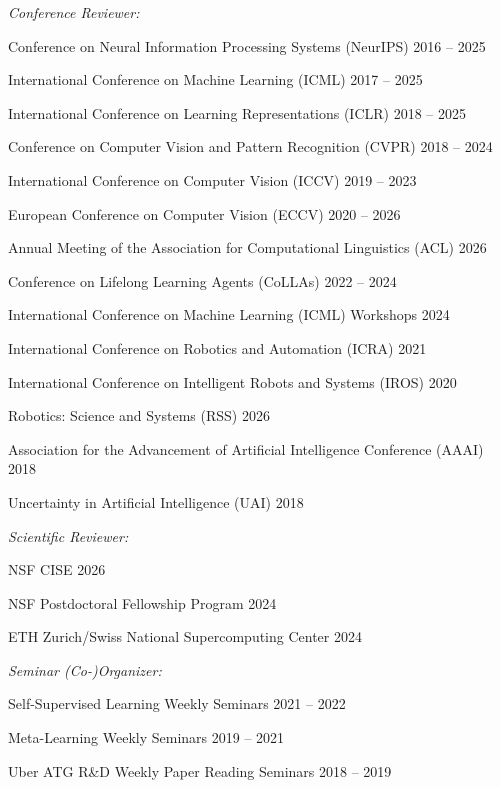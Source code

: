 {\it Conference Reviewer:}
\begin{list2}
\item Conference on Neural Information Processing Systems (NeurIPS)
 \hfill 2016 -- 2025
\item International Conference on Machine Learning (ICML)
 \hfill 2017 -- 2025
\item International Conference on Learning Representations (ICLR)
 \hfill 2018 -- 2025
\item Conference on Computer Vision and Pattern Recognition (CVPR)
 \hfill 2018 -- 2024
\item International Conference on Computer Vision (ICCV)
 \hfill 2019 -- 2023
\item European Conference on Computer Vision (ECCV)
 \hfill 2020 -- 2026
\item Annual Meeting of the Association for Computational Linguistics (ACL)
 \hfill 2026
\item Conference on Lifelong Learning Agents (CoLLAs)
 \hfill 2022 -- 2024
\item International Conference on Machine Learning (ICML) Workshops
 \hfill 2024
\item International Conference on Robotics and Automation (ICRA)
 \hfill 2021
\item International Conference on Intelligent Robots and Systems (IROS)
 \hfill 2020
\item Robotics: Science and Systems (RSS)
 \hfill 2026
\item Association for the Advancement of Artificial Intelligence Conference (AAAI)
 \hfill 2018
\item Uncertainty in Artificial Intelligence (UAI)
 \hfill 2018
\end{list2}

{\it Scientific Reviewer:}
\begin{list2}
\item NSF CISE \hfill 2026
\item NSF Postdoctoral Fellowship Program \hfill 2024
\item ETH Zurich/Swiss National Supercomputing Center \hfill 2024
\end{list2}

{\it Seminar (Co-)Organizer:}
\begin{list2}
\item Self-Supervised Learning Weekly Seminars \hfill 2021 -- 2022
\item Meta-Learning Weekly Seminars \hfill 2019 -- 2021
\item Uber ATG R\&D Weekly Paper Reading Seminars \hfill 2018 -- 2019
\end{list2}

\vspace{0.1in}
\fi